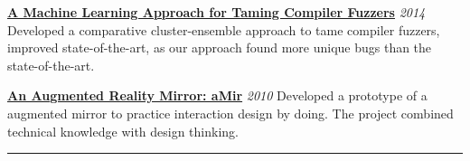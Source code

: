 \documentclass[10pt]{article}
\begin{document}
\href{https://github.com/azarbakht/ML_Project}{\textbf{A Machine Learning Approach for Taming Compiler Fuzzers}} \hfill \textit{2014}\newline
Developed a comparative cluster-ensemble approach to tame compiler fuzzers, improved state-of-the-art, as our approach found more unique bugs than the state-of-the-art.

\href{http://azarbakht.info/augmentedmirror/indexce51.html?/amir/}{\textbf{An Augmented Reality Mirror: aMir}} \hfill \textit{2010}\newline
Developed a prototype of a augmented mirror to practice interaction design by doing. The project combined technical knowledge with design thinking.






\hrule
\end{document}
